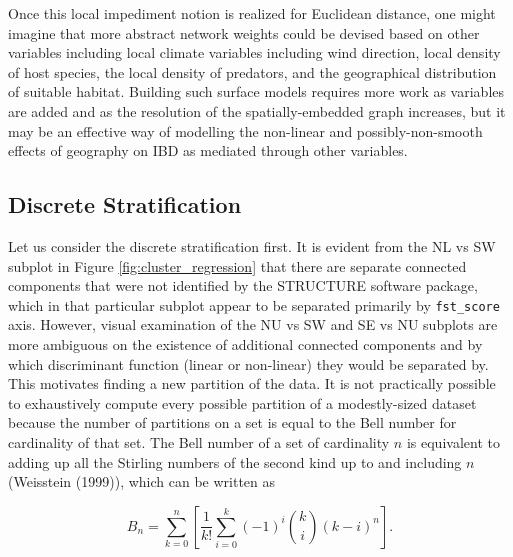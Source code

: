 \documentclass[
  letterpaper,
  DIV=11,
  numbers=noendperiod]{scrreprt}
\begin{document}
Once this local impediment notion is realized for Euclidean distance,
one might imagine that more abstract network weights could be devised
based on other variables including local climate variables including
wind direction, local density of host species, the local density of
predators, and the geographical distribution of suitable habitat.
Building such surface models requires more work as variables are added
and as the resolution of the spatially-embedded graph increases, but it
may be an effective way of modelling the non-linear and
possibly-non-smooth effects of geography on IBD as mediated through
other variables.

\subsection{Discrete Stratification}\label{discrete-stratification}

Let us consider the discrete stratification first. It is evident from
the NL vs SW subplot in Figure \ref{fig:cluster_regression} that there
are separate connected components that were not identified by the
STRUCTURE software package, which in that particular subplot appear to
be separated primarily by \texttt{fst\_score} axis. However, visual
examination of the NU vs SW and SE vs NU subplots are more ambiguous on
the existence of additional connected components and by which
discriminant function (linear or non-linear) they would be separated by.
This motivates finding a new partition of the data. It is not
practically possible to exhaustively compute every possible partition of
a modestly-sized dataset because the number of partitions on a set is
equal to the Bell number for cardinality of that set. The Bell number of
a set of cardinality \(n\) is equivalent to adding up all the Stirling
numbers of the second kind up to and including \(n\) (Weisstein (1999)),
which can be written as

\[B_n = \sum_{k=0}^{n} \left[ \frac{1}{k!} \sum_{i=0}^{k} (-1)^i {k \choose i} (k-i)^n\right].\]
\end{document}

